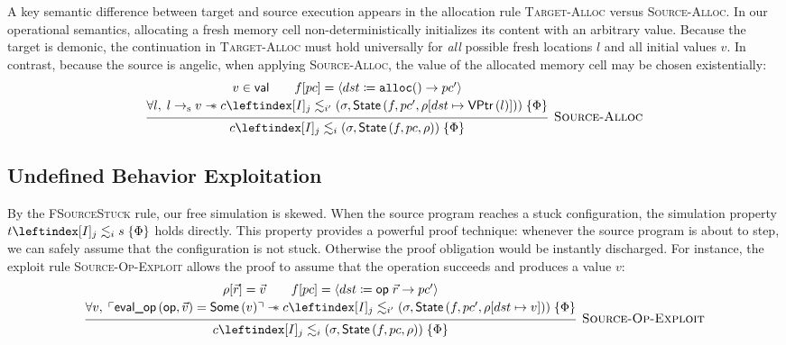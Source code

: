 \documentclass[report.tex]{subfiles}
\begin{document}
A key semantic difference between target and source execution appears
in the allocation rule \textsc{Target-Alloc} versus \textsc{Source-Alloc}.
In our operational semantics,
allocating a fresh memory cell non-deterministically initializes its content
with an arbitrary value.
Because the target is demonic,
the continuation in \textsc{Target-Alloc} must hold universally for
\emph{all} possible fresh locations $l$ and all initial values $v$.
In contrast,
because the source is angelic,
when applying \textsc{Source-Alloc},
the value of the allocated memory cell may be chosen existentially:
\begin{equation*}
  \begin{prooftree}
    \hypo{
      \begin{matrix}
        v \in \val \qquad \pcatis{f}{pc}{\Ialloc{dst}{pc'}}
        \\[.2em]
        \forall l,\;
        \ptrs{l}{v} \wand
        \fsim{c}{j}{i'}
        {(\sigma, \State{f}{pc'}{\setreg{dst}{\VPtr{l}}{\rho}})}
        {\Phi}
      \end{matrix}
    }
    \infer1[\textsc{Source-Alloc}]{
      \fsim{c}{j}{i}{(\sigma, \State{f}{pc}{\rho})}{\Phi}
    }
  \end{prooftree}
\end{equation*}

\subsection{Undefined Behavior Exploitation}

By the \textsc{FSourceStuck} rule, our free simulation is skewed.
When the source program reaches a stuck configuration,
the simulation property $\fsim{t}{j}{i}{s}{\Phi}$ holds directly.
This property provides a powerful proof technique:
whenever the source program is about to step,
we can safely assume that the configuration is not stuck.
Otherwise the proof obligation would be instantly discharged.
For instance,
the exploit rule \textsc{Source-Op-Exploit} allows the proof to assume
that the operation succeeds and produces a value $v$:
\begin{equation*}
  \begin{prooftree}
    \hypo{
      \begin{matrix}
        \getreg{\vec{r}}{\rho} = \vec{v} \qquad
        \pcatis{f}{pc}{\Iop{dst}{\textsf{op}}{\vec{r}}{pc'}}
        \\[.2em]
        \forall v,\;
        \purel{\evalop{\textsf{op}}{\vec{v}} = \Some{v}}
        \wand
        \fsim{c}{j}{i'}
        {(\sigma, \State{f}{pc'}{\setreg{dst}{v}{\rho}})}
        {\Phi}
      \end{matrix}
    }
    \infer1[\textsc{Source-Op-Exploit}]{
      \fsim{c}{j}{i}{(\sigma, \State{f}{pc}{\rho})}{\Phi}
    }
  \end{prooftree}
\end{equation*}
\end{document}
